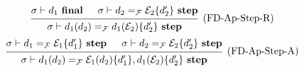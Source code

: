 \documentclass{article}
\newcommand{\entails}{\mathrel{\mathop{\vdash}}}
\newcommand{\final}{~\mathbf{final}}
\newcommand{\istep}{~\mathbf{step}}
\begin{document}
\begin{enumerate}
\begin{enumerate}
\[        \]
        \[
          \begin{prooftree}
            \hypo{\sigma \entails d_1 \final}
            \hypo{
              \sigma \entails
              d_2 =_\mathcal{F} \mathcal{E}_2 \{ d_2' \} \istep
            }
            \infer2[(FD-Ap-Step-R)]{
              \sigma \entails
              d_1(d_2)
              =_\mathcal{F}
              d_1(\mathcal{E}_2) \{d_2'\} \istep
            }
          \end{prooftree}
        \]
        \[
          \begin{prooftree}
            \hypo{\sigma \entails d_1 =_\mathcal{F} \mathcal{E}_1 \{ d_1' \} \istep}
            \hypo{\sigma \entails d_2 =_\mathcal{F} \mathcal{E}_2 \{d_2'\} \istep}
            \infer2[(FD-Ap-Step-A)]{
              \sigma \entails
              d_1(d_2)
              =_\mathcal{F}
              \mathcal{E}_1 (d_2) \{d_1'\}, d_1(\mathcal{E}_2)\{d_2'\} \istep
            }
          \end{prooftree}
        \]


\end{enumerate}
\end{enumerate}
\end{document}
